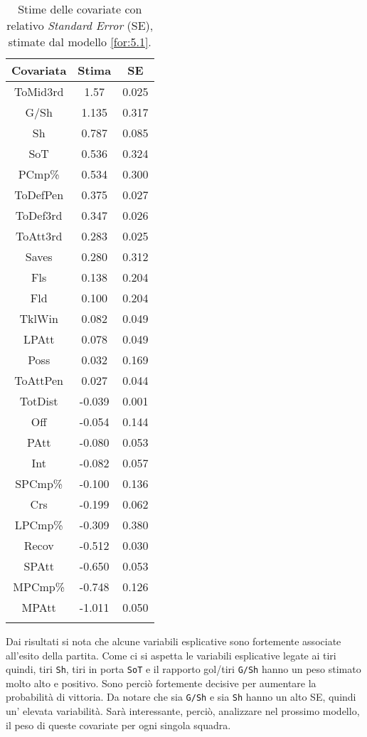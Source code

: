 \begin{table}[htbp]
	
	\renewcommand{\arraystretch}{1.7}
	\centering
	\begin{tabular}{c c c }
		\hline	
		\rowcolor{SchoolColor2}
		\textbf{Covariata} & \textbf{Stima} & \textbf{SE} \\	
		\hline
		ToMid3rd & 1.57 & 0.025\\
		G/Sh & 1.135 & 0.317 \\
		Sh & 0.787 & 0.085 \\  
		SoT &  0.536 & 0.324 \\  
		PCmp\% & 0.534 & 0.300 \\
		ToDefPen & 0.375 & 0.027 \\      
		ToDef3rd & 0.347 & 0.026 \\
		ToAtt3rd & 0.283 & 0.025 \\     	     	 
		Saves & 0.280 & 0.312 \\ 
		Fls & 0.138 & 0.204  \\     
		Fld & 0.100 & 0.204  \\
		TklWin &  0.082 & 0.049  \\    
		LPAtt & 0.078 & 0.049  \\ 		
		Poss & 0.032 & 0.169 \\ 
		ToAttPen & 0.027 & 0.044 \\  
		TotDist & -0.039 & 0.001 \\  	
		Off & -0.054 & 0.144  \\
		PAtt & -0.080 & 0.053 \\ 
		Int & -0.082 & 0.057 \\  
		SPCmp\% & -0.100 & 0.136 \\ 
		Crs & -0.199 & 0.062\\  
		LPCmp\% & -0.309 & 0.380 \\ 
		Recov &  -0.512 & 0.030 \\        
		SPAtt & -0.650 & 0.053 \\     
		MPCmp\% & -0.748 & 0.126 \\
		MPAtt & -1.011 & 0.050 \\     		     		   		    
		\hline
		& &  \\
		
	\end{tabular} \hbox{}
	\caption{Stime delle covariate con relativo \emph{Standard 
			Error} (SE), stimate dal modello \ref{for:5.1}.} \label{tab:BTC2} 
	
\end{table}
Dai risultati si nota che alcune variabili esplicative sono fortemente associate all'esito della partita. Come ci si aspetta le variabili esplicative legate ai tiri quindi, tiri \texttt{Sh}, tiri in porta \texttt{SoT} e il rapporto gol/tiri \texttt{G/Sh} hanno un peso stimato molto alto e positivo. Sono perciò fortemente decisive per aumentare la probabilità di vittoria. Da notare che sia \texttt{G/Sh} e sia \texttt{Sh} hanno un alto SE, quindi un' elevata variabilità. Sarà interessante, perciò, analizzare nel prossimo modello, il peso di queste covariate per ogni singola squadra.
